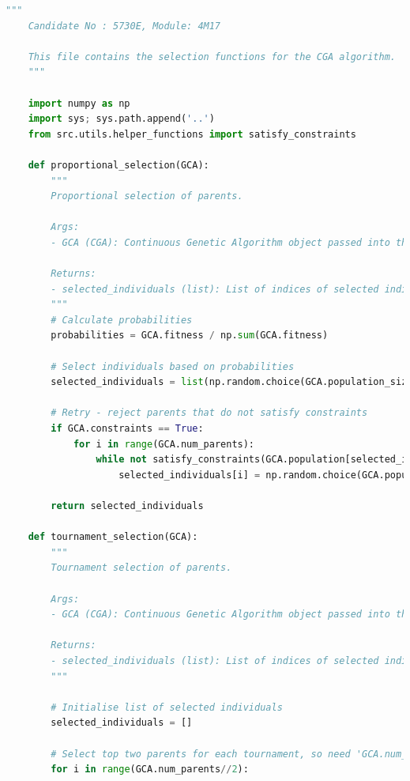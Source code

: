 \documentclass[10pt]{article}
\begin{document}
\begin{lstlisting}[language=Python, caption=selection\_functions.py, label=selection_functionspy]
    """
    Candidate No : 5730E, Module: 4M17 
    
    This file contains the selection functions for the CGA algorithm.
    """
    
    import numpy as np
    import sys; sys.path.append('..')
    from src.utils.helper_functions import satisfy_constraints
    
    def proportional_selection(GCA):
        """
        Proportional selection of parents. 
    
        Args:
        - GCA (CGA): Continuous Genetic Algorithm object passed into this function using self.select_parents(self)
    
        Returns:
        - selected_individuals (list): List of indices of selected individuals for mating, length = GCA.num_parents
        """
        # Calculate probabilities
        probabilities = GCA.fitness / np.sum(GCA.fitness)
    
        # Select individuals based on probabilities
        selected_individuals = list(np.random.choice(GCA.population_size, size=GCA.num_parents, p=probabilities))
    
        # Retry - reject parents that do not satisfy constraints
        if GCA.constraints == True:
            for i in range(GCA.num_parents):
                while not satisfy_constraints(GCA.population[selected_individuals[i]]):
                    selected_individuals[i] = np.random.choice(GCA.population_size, p=probabilities)
        
        return selected_individuals
    
    def tournament_selection(GCA):
        """
        Tournament selection of parents. 
    
        Args:
        - GCA (CGA): Continuous Genetic Algorithm object passed into this function using self.select_parents(self)
    
        Returns:
        - selected_individuals (list): List of indices of selected individuals for mating, length = GCA.num_parents
        """
    
        # Initialise list of selected individuals
        selected_individuals = []
    
        # Select top two parents for each tournament, so need 'GCA.num_parents // 2' tournaments
        for i in range(GCA.num_parents//2):
    

\end{lstlisting}
\end{document}
